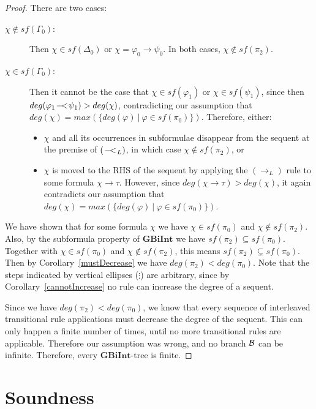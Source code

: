 \documentclass{llncs}
\numberwithin{equation}{section}
\newcommand{\ExImp}{\rightarrow}
\newcommand{\Imp}{\rightarrow}
\newcommand{\WeakImp}{
\begin{picture}(10,10)
     \put(1,0){$-$}
     \put(7,0){$<$}
   \end{picture}
   \;\; 
}
\newcommand{\mycal}[1]{
        {\cal{#1}}
}
\newcommand{\GBiInt}{\mathbf{GBiInt}}
\newcommand{\ImpLeftAllRule}{(\Imp_{L})}
\newcommand{\WeakImpLeftRule}{({\WeakImp_L})}
\begin{document}
\begin{proof}
There are two cases:
\begin{description}
	\item[$\chi \not\in sf(\Gamma_0)$:]	Then $\chi \in sf(\Delta_0)$ or $\chi = \varphi_0 \ExImp \psi_0$. In both cases, $\chi \not\in sf(\pi_2)$.
	\item[$\chi \in sf(\Gamma_0)$:] Then it cannot be the case that $\chi \in sf(\varphi_1)$ or $\chi \in sf(\psi_1)$, since then $deg(\varphi_1 \WeakImp \psi_1) > deg(\chi)$, contradicting our assumption that $deg(\chi) = max(\{ deg(\varphi) \ | \ \varphi \in sf(\pi_0)\})$. Therefore, either:
	\begin{itemize}
		\item $\chi$ and all its occurrences in subformulae disappear from the sequent at the premise of $\WeakImpLeftRule$, in which case $\chi \not\in sf(\pi_2)$, or
		\item $\chi$ is moved to the RHS of the sequent by applying the $\ImpLeftAllRule$ rule to some formula $\chi \ExImp \tau$. However, since $deg(\chi \ExImp \tau) > deg(\chi)$, it again contradicts our assumption that $deg(\chi) = max(\{ deg(\varphi) \ | \ \varphi \in sf(\pi_0)\})$.	
	\end{itemize} 
\end{description}

We have shown that for some formula $\chi$ we have $\chi \in sf(\pi_0)$ and $\chi \not\in sf(\pi_2)$. Also, by the subformula property of $\GBiInt$ we have $sf(\pi_2) \subseteq sf(\pi_0)$. Together with $\chi \in sf(\pi_0)$ and $\chi \not\in sf(\pi_2)$, this means $sf(\pi_2) \subsetneq sf(\pi_0)$. Then by Corollary~\ref{mustDecrease} we have $deg(\pi_2) < deg(\pi_0)$. Note that the steps indicated by vertical ellipses ($\vdots$) are arbitrary, since by Corollary~\ref{cannotIncrease} no rule can increase the degree of a sequent.
	
Since we have $deg(\pi_2) < deg(\pi_0)$, we know that every sequence of interleaved transitional rule applications must decrease the degree of the sequent. This can only happen a finite number of times, until no more transitional rules are applicable. Therefore our assumption was wrong, and no branch $\mycal{B}$ can be infinite. Therefore, every $\GBiInt$-tree is finite.
\end{proof}

\section{Soundness}\label{soundness}
\end{document}
